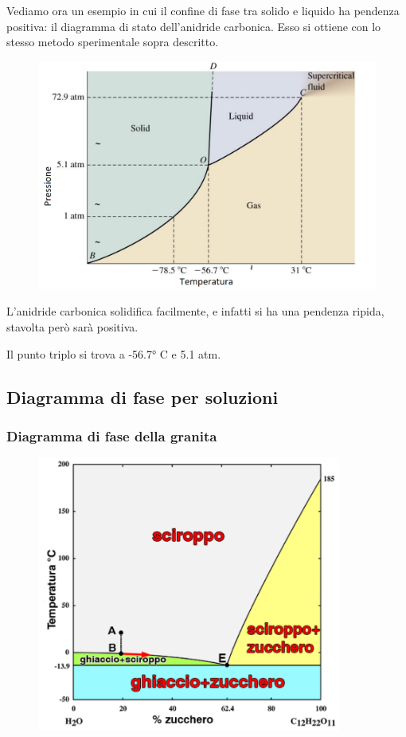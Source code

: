 Vediamo ora un esempio in cui il confine di fase tra solido e liquido ha pendenza positiva: il diagramma di stato dell'anidride carbonica. Esso si ottiene con lo stesso metodo sperimentale sopra descritto.

\begin{figure}[htp]
    \centering
    \includegraphics[width=12cm]{immagini/diagramma_di_stato_CO2.png}
\end{figure}

L'anidride carbonica solidifica facilmente, e infatti si ha una pendenza ripida, stavolta però sarà positiva.

Il punto triplo si trova a -56.7° C e 5.1 atm.

\subsection{Diagramma di fase per soluzioni}
\subsubsection{Diagramma di fase della granita}

\begin{figure}[htp]
    \centering
    \includegraphics[width=10cm]{immagini/diagramma_di_stato_sciroppo.png}
\end{figure}

